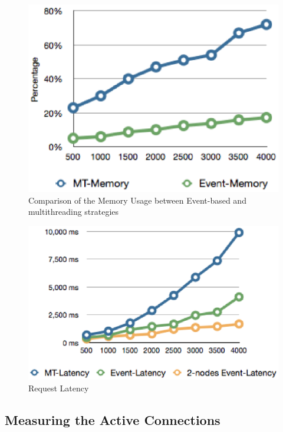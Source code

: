 \begin{figure}[htb!]
\centering%
    \includegraphics[scale=0.60]{figures/memory.eps}
    \caption{Comparison of the Memory Usage between Event-based and multithreading strategies}
    \label{fig:memory}
\end{figure}

\begin{figure}[htb!]
\centering%
    \includegraphics[scale=0.60]{figures/event_thread_latency.eps}
    \caption{Request Latency}
    \label{fig:memory}
\end{figure}

\subsection{Measuring the Active Connections\\}

